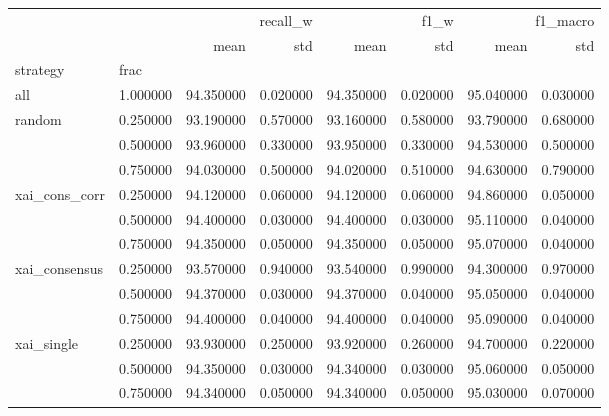 \begin{tabular}{llrrrrrr}
\toprule
 &  & \multicolumn{2}{r}{recall_w} & \multicolumn{2}{r}{f1_w} & \multicolumn{2}{r}{f1_macro} \\
 &  & mean & std & mean & std & mean & std \\
strategy & frac &  &  &  &  &  &  \\
\midrule
all & 1.000000 & 94.350000 & 0.020000 & 94.350000 & 0.020000 & 95.040000 & 0.030000 \\
\cline{1-8}
\multirow[t]{3}{*}{random} & 0.250000 & 93.190000 & 0.570000 & 93.160000 & 0.580000 & 93.790000 & 0.680000 \\
 & 0.500000 & 93.960000 & 0.330000 & 93.950000 & 0.330000 & 94.530000 & 0.500000 \\
 & 0.750000 & 94.030000 & 0.500000 & 94.020000 & 0.510000 & 94.630000 & 0.790000 \\
\cline{1-8}
\multirow[t]{3}{*}{xai_cons_corr} & 0.250000 & 94.120000 & 0.060000 & 94.120000 & 0.060000 & 94.860000 & 0.050000 \\
 & 0.500000 & 94.400000 & 0.030000 & 94.400000 & 0.030000 & 95.110000 & 0.040000 \\
 & 0.750000 & 94.350000 & 0.050000 & 94.350000 & 0.050000 & 95.070000 & 0.040000 \\
\cline{1-8}
\multirow[t]{3}{*}{xai_consensus} & 0.250000 & 93.570000 & 0.940000 & 93.540000 & 0.990000 & 94.300000 & 0.970000 \\
 & 0.500000 & 94.370000 & 0.030000 & 94.370000 & 0.040000 & 95.050000 & 0.040000 \\
 & 0.750000 & 94.400000 & 0.040000 & 94.400000 & 0.040000 & 95.090000 & 0.040000 \\
\cline{1-8}
\multirow[t]{3}{*}{xai_single} & 0.250000 & 93.930000 & 0.250000 & 93.920000 & 0.260000 & 94.700000 & 0.220000 \\
 & 0.500000 & 94.350000 & 0.030000 & 94.340000 & 0.030000 & 95.060000 & 0.050000 \\
 & 0.750000 & 94.340000 & 0.050000 & 94.340000 & 0.050000 & 95.030000 & 0.070000 \\
\cline{1-8}
\bottomrule
\end{tabular}

